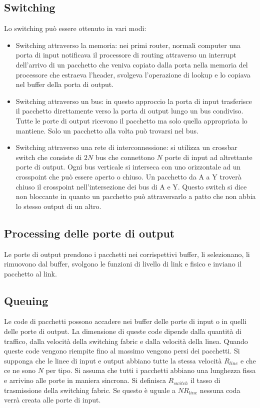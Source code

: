 \subsection{Switching}
Lo switching pu\`o essere ottenuto in vari modi:
\begin{itemize}
\item Switching attraverso la memoria: nei primi router, normali computer una porta di input notificava il processore di routing attraverso un interrupt 
dell'arrivo di un pacchetto che veniva copiato dalla porta nella memoria del processore che estraeva l'header, svolgeva l'operazione di lookup e lo copiava
nel buffer della porta di output. 
\item Switching attraverso un bus: in questo approccio la porta di input trasferisce il pacchetto direttamente verso la porta di output lungo un bus 
condiviso. Tutte le porte di output ricevono il pacchetto ma solo quella appropriata lo mantiene. Solo un pacchetto alla volta pu\`o trovarsi nel bus.
\item Switching attraverso una rete di interconnessione: si utilizza un crossbar switch che consiste di $2N$ bus che connettono $N$ porte di input ad 
altrettante porte di output. Ogni bus verticale si interseca con uno orizzontale ad un crosspoint che pu\`o essere aperto o chiuso. Un pacchetto da A a Y
trover\`a chiuso il crosspoint nell'intersezione dei bus di A e Y. Questo switch si dice non bloccante in quanto un pacchetto pu\`o attraversarlo a patto 
che non abbia lo stesso output di un altro.
\end{itemize}
\subsection{Processing delle porte di output}
Le porte di output prendono i pacchetti nei corrispettivi buffer, li selezionano, li rimuovono dal buffer, svolgono le funzioni di livello di link e fisico
e inviano il pacchetto al link.
\subsection{Queuing}
Le code di pacchetti possono accadere nei buffer delle porte di input o in quelli delle porte di output. La dimensione di queste code dipende dalla 
quantit\`a di traffico, dalla velocit\`a della switching fabric e dalla velocit\`a della linea. Quando queste code vengono riempite fino al massimo 
vengono persi dei pacchetti. Si supponga che le linee di input e output abbiano tutte la stessa velocit\`a $R_{line}$ e che ce ne sono $N$ per tipo. Si 
assuma che tutti i pacchetti abbiano una lunghezza fissa e arrivino alle porte in maniera sincrona. Si definisca $R_{switch}$ il tasso di trasmissione della
switching fabric. Se questo \`e uguale a $NR_{line}$ nessuna coda verr\`a creata alle porte di input. 
